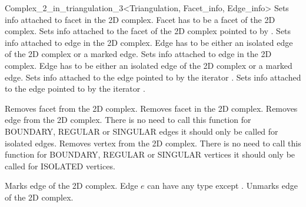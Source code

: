 \begin{ccRefClass}{Complex_2_in_triangulation_3<Triangulation, Facet_info, Edge_info>}
\ccGlue
{}
{Sets info attached
to facet  in the 2D complex.
\ccPrecond Facet  has to be a facet of the 2D complex.}
\ccGlue
{}
{Sets info attached to the facet of the 2D complex pointed
to by .}
\ccGlue
{}
{Sets info attached
to edge  in the 2D complex.
\ccPrecond Edge  has to be either an isolated edge
of the 2D complex  or a marked edge.}
\ccGlue
{}
{Sets info attached
to edge  in the 2D complex.
\ccPrecond Edge  has to be either an isolated edge
of the 2D complex  or a marked edge.}
\ccGlue
{}
{Sets info attached
to the edge pointed to by the iterator .}
\ccGlue
{}
{Sets info attached
to the edge pointed to by the iterator .}


{Removes facet  from  the 2D complex.}
\ccGlue
{}
{Removes facet  in the 2D complex.}
\ccGlue
{}
{Removes edge
 from the 2D complex.
There is no need to call this function  for BOUNDARY,  REGULAR or SINGULAR edges
it should only be called  for isolated edges.}
\ccGlue
{}
{Removes vertex   from  the 2D complex.
There is no need to call this function  for BOUNDARY,  REGULAR or SINGULAR vertices
it should only be called  for ISOLATED vertices.}

\ccGlue
{}
{Marks edge  of  the 2D complex.
Edge $e$ can have any type except .}
\ccGlue
{}
\ccGlue
{}
{Unmarks edge  of  the 2D complex.}



\end{ccRefClass}
